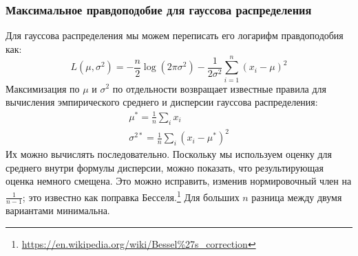 \subsubsection*{Максимальное правдоподобие для гауссова распределения}

Для гауссова распределения мы можем переписать его логарифм правдоподобия как:
%
$$
L(\mu, \sigma^2) = - \frac{n}{2}\log(2\pi \sigma^2) - \frac{1}{2\sigma^2}\sum_{i=1}^n(x_i-\mu)^2
$$
%
Максимизация по $\mu$ и $\sigma^2$ по отдельности возвращает известные правила для вычисления эмпирического среднего и дисперсии гауссова распределения:
%
\begin{gather}
\mu^*=\frac{1}{n}\sum_i x_i \\\sigma^{2*}=\frac{1}{n}\sum_i(x_i-\mu^*)^2
\end{gather}
%
Их можно вычислять последовательно. Поскольку мы используем оценку для среднего внутри формулы дисперсии, можно показать, что результирующая оценка немного смещена. Это можно исправить, изменив нормировочный член на $\frac{1}{n-1}$; это известно как поправка Бесселя.\footnote{\url{https://en.wikipedia.org/wiki/Bessel\%27s\_correction}} Для больших $n$ разница между двумя вариантами минимальна.
